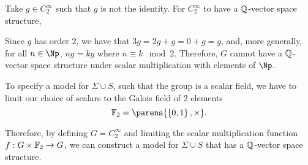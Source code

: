 Take $g \in C_2^{\infty}$ such that $g$ is not the identity.
For $C_2^\infty$ to have a $\mathbb{Q}$-vector space structure,

Since $g$ has order $2$, we have that $3g = 2g + g = 0 + g = g$,
and, more generally, for all $n \in \Np$, $ng = k g$ where $n \equiv k \mod 2$.
Therefore, $G$ cannot have a $\mathbb{Q}$-vector space structure under scalar multiplication
with elements of $\Np$.

To specify a model for $\Sigma \cup S$, such that the group is a scalar field,
we have to limit our choice of scalars to the Galois field of $2$ elements
\[ \F_2 = \parens{\set{0, 1}, \times}. \]

Therefore, by defining $G = C_2^{\infty}$ and limiting the scalar multiplication
function $f: G \times \mathbb{F}_2 \to G$, we can construct a model for $\Sigma \cup S$
that has a $\mathbb{Q}$-vector space structure.


